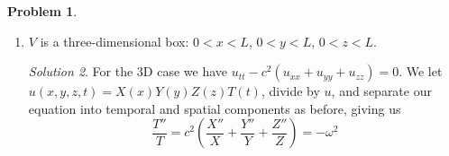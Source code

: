 \documentclass[12pt,a4paper]{article}
\theoremstyle{definition}
\newtheorem{problem}{Problem}
\theoremstyle{remark}
\newtheorem*{solution}{Solution}
\begin{document}
\begin{problem}
\begin{enumerate}[label=(\alph*)]
\begin{solution}
            The temporal solution is the same as before, $$T(t) = A \cos \omega t + B \sin \omega t$$

            For the spatial dependence we have $$\frac{X''}{X}+ \frac{Y''}{Y} = - \frac{\omega^2}{c^2}$$

            This PDE is also separable, and is equivalent to $$X'' = -\alpha^2 X, \qquad Y'' = -\beta^2 Y, \qquad \alpha^2 + \beta^2 =  \frac{\omega^2}{c^2}$$

            We can satisfy the summation criteria by letting $\alpha = \frac{\omega}{c} \cos \phi$ and $\beta = \frac{\omega}{c} \sin \phi$ for some constant $\phi$. With this, the general solution to these ODEs can be written as $$X(x) = A \cos \left(\cos \phi \frac{\omega}{c} x \right) + B \sin \left( \cos \phi\frac{\omega}{c} x \right)$$
            $$Y(y) = A \cos \left(\sin \phi \frac{\omega}{c} y \right) + B \sin \left( \sin \phi\frac{\omega}{c} y \right)$$

            To satisy our boundary conditions we must have $X(0) = Y(0)= X(L) = Y(L) = 0$, and hence our particular solutions in the spatial domain are given by $$X_n(x) = A \sin \left( \frac{n \pi}{L} x \right)$$
            $$Y_m(y) = A \sin \left( \frac{m \pi}{L} y \right)$$

            which means that we must have $$\cos \phi \frac{\omega}{c} = \frac{n \pi}{L} \quad \Rightarrow \quad \omega = \frac{n \pi c}{L\cos \phi}, \quad n \in \{1, 2, \dots \}$$
            $$\sin \phi \frac{\omega}{c} = \frac{m \pi}{L} \quad \Rightarrow \quad \omega = \frac{m \pi c}{L\sin \phi}, \quad m \in \{1, 2, \dots \}$$

            For these two $\omega$ expressions to be equivalent, we must have that $\phi = \arctan\left( \frac{m}{n} \right)$, so that $$\omega = \frac{m \pi c}{L \sin (\arctan \frac{m}{n})} = \frac{n \pi c}{L \cos(\arctan\frac{m}{n})} = \frac{\pi c \sqrt{n^2 + m^2}}{L}$$

            Hence the quantized frequency of oscillation $\omega$ is given by 

            $$\omega = \frac{\pi c \sqrt{n^2 + m^2}}{L} \qquad n, m \in \{1, 2, \dots \}$$

        \end{solution}
        \item $V$ is a three-dimensional box: $0 < x < L$, $0 < y < L$, $0 < z < L$. 
        \begin{solution}
            For the 3D case we have $u_{tt} - c^2(u_{xx} + u_{yy} + u_{zz}) = 0$. We let $u(x,y,z,t) = X(x)Y(y)Z(z)T(t)$, divide by $u$, and separate our equation into temporal and spatial components as before, giving us $$\frac{T''}{T} = c^2 \left( \frac{X''}{X} + \frac{Y''}{Y} + \frac{Z''}{Z}\right) = -\omega^2$$


\end{solution}
\end{enumerate}
\end{problem}
\end{document}
